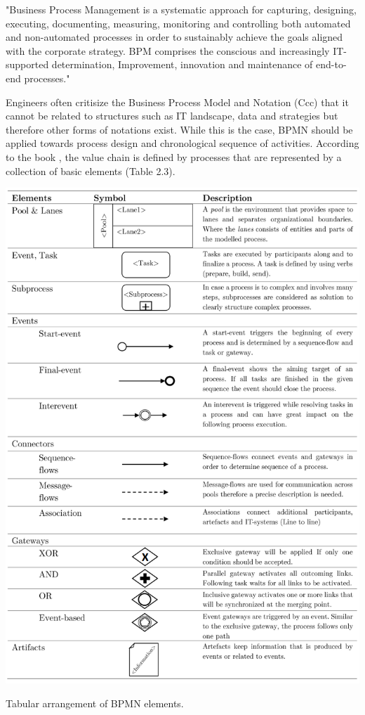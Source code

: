 \par
\begingroup
\leftskip=1cm %
\noindent %
"Business Process Management is a systematic approach for capturing, designing, executing, documenting, measuring, monitoring and controlling both automated and non-automated processes in order to sustainably achieve the goals aligned with the corporate strategy.
BPM comprises the conscious and increasingly IT-supported determination,
Improvement, innovation and maintenance of end-to-end processes."
\par
\endgroup
Engineers often critisize the Business Process Model and Notation (\gls{Ccc}) that it cannot be related to structures such as IT landscape, data and strategies but therefore other forms of notations exist. While this is the case, BPMN should be applied towards process design and chronological sequence of activities. According to the book \cite{FREUND.2016}, the value chain is defined by processes that are represented by a collection of basic elements (Table 2.3).

\begin{table}[!hb]
	\centering
	\label{tbl:TableLatexShortened}
	\includegraphics[scale=0.83]{TableBPMNLatex}
	\caption{Tabular arrangement of BPMN elements.}
\end{table}

